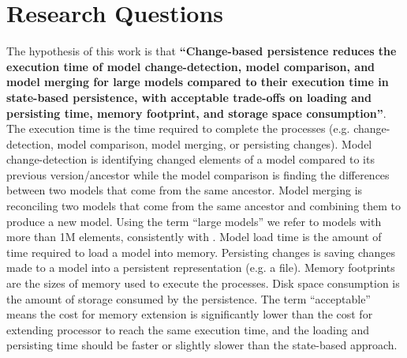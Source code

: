 \section{Research Questions}
\label{sec:research_questions}
The hypothesis of this work is that \textbf{``Change-based persistence reduces the execution time of model change-detection, model comparison, and model merging for large models compared to their execution time in state-based persistence, with acceptable trade-offs on loading and persisting time, memory footprint, and storage space consumption''}. The execution time is the time required to complete the processes (e.g. change-detection, model comparison, model merging, or persisting changes). Model change-detection is identifying changed elements of a model compared to its previous version/ancestor while the model comparison is finding the differences between two models that come from the same ancestor. Model merging is reconciling two models that come from the same ancestor and combining them to produce a new model. Using the term ``large models'' we refer to models with more than 1M elements, consistently with \cite{daniel2016neoemf,DBLP:conf/models/Espinazo-PaganCM11}. Model load time is the amount of time required to load a model into memory. Persisting changes is saving changes made to a model into a persistent representation (e.g. a file). Memory footprints are the sizes of memory used to execute the processes. Disk space consumption is the amount of storage consumed by the persistence. The term ``acceptable'' means the cost for memory extension is significantly lower than the cost for extending processor to reach the same execution time, and the loading and persisting time should be faster or slightly slower than the state-based approach.\\

